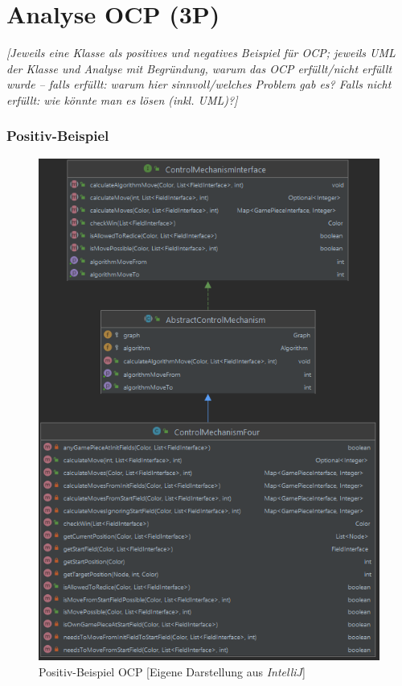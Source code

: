 \newpage
\noindent

\section{Analyse OCP (3P)}
\emph{[Jeweils eine Klasse als positives und negatives Beispiel für OCP; jeweils UML der Klasse und
Analyse mit Begründung, warum das OCP erfüllt/nicht erfüllt wurde – falls erfüllt: warum hier
sinnvoll/welches Problem gab es? Falls nicht erfüllt: wie könnte man es lösen (inkl. UML)?]}
\subsubsection{Positiv-Beispiel}
\begin{figure}[htbp]
\centering
\centerline{\includegraphics[scale=.55]{positivbeispiel_ocp}}
\caption{Positiv-Beispiel OCP [Eigene Darstellung aus \emph{IntelliJ}]}
\label{fig:positivbeispiel_ocp}
\end{figure}

